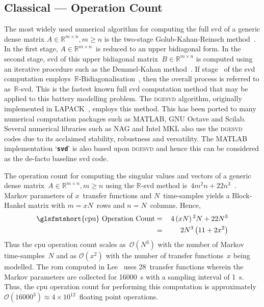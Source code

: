 \subsection{Classical  ---  Operation Count}\label{subsec:Traditional-DRA--CPU}

The most widely  used numerical algorithm for computing the  full \gls{svd} of a
generic dense matrix ${\ensuremath{A\in\mathbb{R}^{m \times n},m\geq n}}$ is the
two-stage  Golub-Kahan-Reinsch  method~\cite{Golub2013}.  In  the  first  stage,
${A\in\mathbb{R}^{m \times n}}$~is  reduced to an upper bidiagonal  form. In the
second  stage, \gls{svd}  of  this  upper bidiagonal  matrix~${B\in\mathbb{R}^{m
\times   n}}$  is   computed  using   an   iterative  procedure   such  as   the
Demmel-Kahan method~\cite{Golub2013}. If  stage~ of the \gls{svd}
computation  employs~$\mathbb{R}$-Bidiagonalisation~\cite{Golub2013},  then  the
overall  process is  referred to  as~\mbox{$\mathbb{R}$-\gls{svd}}. This  is the
fastest known  full \gls{svd}  computation method  that may  be applied  to this
battery modelling problem. The \textsc{dgesvd} algorithm, originally implemented
in  \textsc{LAPACK}~\cite{Anderson1999},  employs  this method.  This  has  been
ported to  many numerical computation  packages such  as MATLAB, GNU  Octave and
Scilab.  Several  numerical  libraries  such  as NAG  and  Intel  MKL  also  use
the  \textsc{dgesvd}  codes  due  to its  acclaimed  stability,  robustness  and
versatility.  The MATLAB  implementation `\texttt{\textbf{svd}}'  is also  based
upon \textsc{dgesvd} and  hence this can be considered as  the de-facto baseline
\gls{svd} code.

The    operation    count    for    computing   the    singular    values    and
vectors    of    a    generic    dense    matrix~${\ensuremath{A\in\mathbb{R}^{m
\times   n},m\geq   n}}$    using   the   \mbox{$\mathbb{R}$-\gls{svd}}   method
is~${\ensuremath{4m^{2}n+22n^{3}}}$~\cite{Golub2013}.   Markov   parameters   of
$x$~transfer functions  and $N$~time-samples  yields a Block-Hankel  matrix with
$m=x N$~rows and $n=N$~columns. Hence,
\begin{alignat}{2}
    \text{\glsfmtshort{cpu} Operation  Count} & = & \,4\left(xN\right){}^{2}N+22N^{3}\nonumber \\
                                              & = & \,2N^{3}\left(11+2x^{2}\right)\label{eq:cpu_op_count}
\end{alignat}
Thus  the  \gls{cpu} operation  count  scales  as~${\mathcal{O}(N^{3})}$ with  the
number of Markov time-samples~$N$ and as ${\mathcal{O}(x^{2})}$ with the number of
transfer  functions~$x$ being  modelled. The  \gls{rom} computed  in Lee~\etal{}
uses  28~transfer functions  wherein  the Markov  parameters  are collected  for
\SI{16000}{\second}  with  a sampling  interval  of  \SI{1}{\second}. Thus,  the
\gls{cpu}  operation  count for  performing  this  computation is  approximately
${\mathcal{O}(16000^{3})\approx 4 \times 10^{12}}$~floating point operations.


